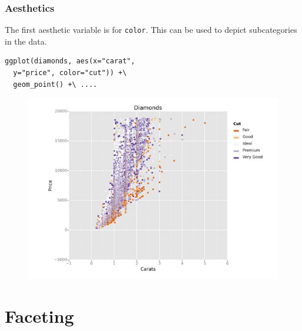 \documentclass{beamer}
\begin{document}
\begin{frame}[fragile]
	\frametitle{Aesthetics}
	\Large
The first aesthetic variable is for \texttt{color}. This can be used to depict subcategories in the data.
	\begin{framed}
		\begin{verbatim}
ggplot(diamonds, aes(x="carat", 
  y="price", color="cut")) +\
  geom_point() +\ ....
	\end{verbatim}
\end{framed}

\end{frame}
\begin{frame}
	
	\begin{figure}
\centering
\includegraphics[width=1.1\linewidth]{aesthetic2}
\end{figure}

\end{frame}
\section{Faceting}
\end{document}
